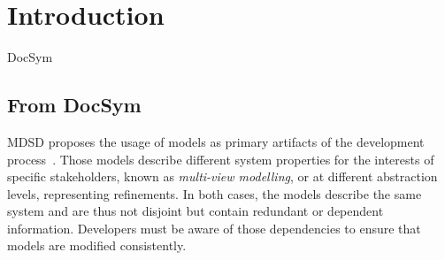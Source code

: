 \chapter{Introduction
}
\label{chap:introduction}

\begin{copiedFrom}{DocSym}

\section{From DocSym}


\acl{MDSD} proposes the usage of models as primary artifacts of the %
development process~\cite{stahl2006a}. 
Those models describe different system properties for the interests of specific stakeholders, known as \emph{multi-view modelling}, or at different abstraction levels, representing refinements. In both cases, the models describe the same system and are thus not disjoint but contain redundant or dependent information. 
Developers must be aware of those dependencies to ensure that models are modified consistently. 


\end{copiedFrom}
